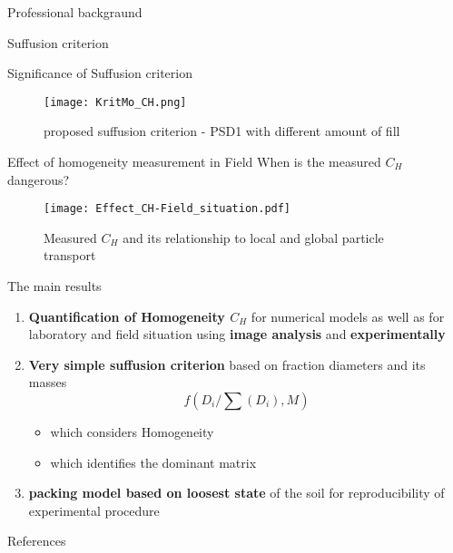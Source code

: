 \documentclass[10pt,xcolor=dvipsnames]{beamer}
\begin{document}
{\begin{frame}{Professional backgraund}
{\begin{frame}{Suffusion criterion}
	
\end{frame}
}

{
\usenavigationsymbolstemplate{}
\begin{frame}{Significance of Suffusion criterion}
\begin{figure}[H]
   \centering
\texttt{[image: KritMo\_CH.png]} 
\vspace{-0.3cm}
        \caption{proposed suffusion criterion - PSD1 with different amount of fill}
        \label{fig:Krit_MO}
\end{figure}

	
\end{frame}
}


\begin{frame}{Effect of homogeneity measurement in Field}
When is the measured $C_{H}$ dangerous?
\begin{figure}[H]
   \centering
\texttt{[image: Effect\_CH-Field\_situation.pdf]} 
\vspace{-0.3cm}
        \caption{Measured $C_{H}$ and its relationship to local and global particle transport }
        \label{fig:CH-field}
\end{figure}
\end{frame}



\begin{frame}{The main results}
\begin{enumerate}
	\item \textbf{Quantification of Homogeneity $C_{H}$} for numerical models as well as for laboratory and field situation using \textbf{image analysis} and \textbf{experimentally}
	\item \textbf{Very simple suffusion criterion} based on fraction diameters and its masses $$ f(D_{i}/\sum(D_{i}),M)$$
	\begin{itemize}
		\item which considers Homogeneity
		\item which identifies the dominant matrix
	\end{itemize} 
	\item \textbf{packing model based on loosest state} of the soil for reproducibility of experimental procedure
\end{enumerate}
\end{frame}







{\Large
{}
}
\begin{frame}[allowframebreaks]{References}


\end{frame}
\end{frame}}
\end{document}
